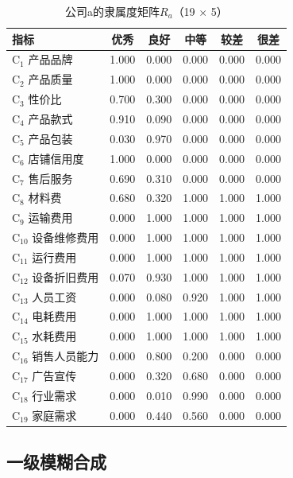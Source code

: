 \documentclass[a4paper,12pt]{ctexart}
\begin{document}
\begin{table}[H]
\centering
\caption{公司a的隶属度矩阵$R_a$（19 $\times$ 5）}
\label{tab:membership}
\scriptsize
\begin{tabular}{lccccc}
\toprule
指标 & 优秀 & 良好 & 中等 & 较差 & 很差 \\
\midrule
C$_1$ 产品品牌      & 1.000 & 0.000 & 0.000 & 0.000 & 0.000 \\
C$_2$ 产品质量      & 1.000 & 0.000 & 0.000 & 0.000 & 0.000 \\
C$_3$ 性价比        & 0.700 & 0.300 & 0.000 & 0.000 & 0.000 \\
C$_4$ 产品款式      & 0.910 & 0.090 & 0.000 & 0.000 & 0.000 \\
C$_5$ 产品包装      & 0.030 & 0.970 & 0.000 & 0.000 & 0.000 \\
C$_6$ 店铺信用度    & 1.000 & 0.000 & 0.000 & 0.000 & 0.000 \\
C$_7$ 售后服务      & 0.690 & 0.310 & 0.000 & 0.000 & 0.000 \\
C$_8$ 材料费        & 0.680 & 0.320 & 1.000 & 1.000 & 1.000 \\
C$_9$ 运输费用      & 0.000 & 1.000 & 1.000 & 1.000 & 1.000 \\
C$_{10}$ 设备维修费用 & 0.000 & 1.000 & 1.000 & 1.000 & 1.000 \\
C$_{11}$ 运行费用   & 0.000 & 1.000 & 1.000 & 1.000 & 1.000 \\
C$_{12}$ 设备折旧费用 & 0.070 & 0.930 & 1.000 & 1.000 & 1.000 \\
C$_{13}$ 人员工资   & 0.000 & 0.080 & 0.920 & 1.000 & 1.000 \\
C$_{14}$ 电耗费用   & 0.000 & 1.000 & 1.000 & 1.000 & 1.000 \\
C$_{15}$ 水耗费用   & 0.000 & 1.000 & 1.000 & 1.000 & 1.000 \\
C$_{16}$ 销售人员能力 & 0.000 & 0.800 & 0.200 & 0.000 & 0.000 \\
C$_{17}$ 广告宣传   & 0.000 & 0.320 & 0.680 & 0.000 & 0.000 \\
C$_{18}$ 行业需求   & 0.000 & 0.010 & 0.990 & 0.000 & 0.000 \\
C$_{19}$ 家庭需求   & 0.000 & 0.440 & 0.560 & 0.000 & 0.000 \\
\bottomrule
\end{tabular}
\end{table}

\subsection{一级模糊合成}
\end{document}
